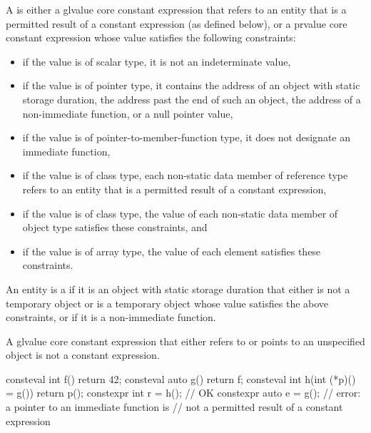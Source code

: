 \pnum
A  is either
a glvalue core constant expression that refers to
an entity that is a permitted result of a constant expression (as defined below), or
a prvalue core constant expression whose value
satisfies the following constraints:
\begin{itemize}
  \item
  if the value is of scalar type,
  it is not an indeterminate value,

  \item
  if the value is of pointer type, it contains
  the address of an object with static storage duration,
  the address past the end of such an object,
  the address of a non-immediate function,
  or a null pointer value,

  \item
  if the value is of pointer-to-member-function type,
  it does not designate an immediate function,

  \item
  if the value is of class type,
  each non-static data member of reference type refers to
  an entity that is a permitted result of a constant expression,

  \item
  if the value is of class type,
  the value of each non-static data member
  of object type satisfies these constraints, and

  \item
  if the value is of array type,
  the value of each element satisfies these constraints.
\end{itemize}
An entity is a
if it is an
object with static storage duration that either is not a temporary object or is
a temporary object whose value satisfies the above constraints, or if
it is a non-immediate function.
\begin{note}
A glvalue core constant expression
that either refers to or points to an unspecified object
is not a constant expression.
\end{note}
\begin{example}
\begin{codeblock}
consteval int f() { return 42; }
consteval auto g() { return f; }
consteval int h(int (*p)() = g()) { return p(); }
constexpr int r = h();                          // OK
constexpr auto e = g();                         // error: a pointer to an immediate function is
                                                // not a permitted result of a constant expression
\end{codeblock}
\end{example}

